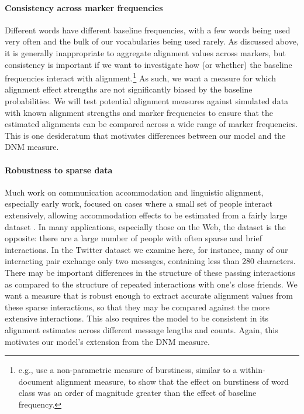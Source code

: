 \documentclass{acm_proc_article-sp}
\begin{document}
\paragraph{Consistency across marker frequencies} Different words have different baseline frequencies, with a few words being used very often and the bulk of our vocabularies being used rarely. As discussed above, it is generally inappropriate to aggregate alignment values across markers, but consistency is important if we want to investigate how (or whether) the baseline frequencies interact with alignment.\footnote{e.g., \cite{Church2000} use a non-parametric measure of burstiness, similar to a within-document alignment measure, to show that the effect on burstiness of word class was an order of magnitude greater than the effect of baseline frequency.}   As such, we want a measure for which alignment effect strengths are not significantly biased by the baseline probabilities.  We will test potential alignment measures against simulated data with known alignment strengths and marker frequencies to ensure that the estimated alignments can be compared across a wide range of marker frequencies.  This is one desideratum that motivates differences between our model and the DNM measure.

\paragraph{Robustness to sparse data} Much work on communication accommodation and linguistic alignment, especially early work, focused on cases where a small set of people interact extensively, allowing accommodation effects to be estimated from a fairly large dataset \cite{Ferrara1991,GonzalesHancockPennebaker2009,IrelandEtAl2011}.  In many applications, especially those on the Web, the dataset is the opposite: there are a large number of people with often sparse and brief interactions.  In the Twitter dataset we examine here, for instance, many of our interacting pair exchange only two messages, containing less than 280 characters.  There may be important differences in the structure of these passing interactions as compared to the structure of repeated interactions with one's close friends.  We want a measure that is robust enough to extract accurate alignment values from these sparse interactions, so that they may be compared against the more extensive interactions.  This also requires the model to be consistent in its alignment estimates across different message lengths and counts. Again, this motivates our model's extension from the DNM measure.
\end{document}
